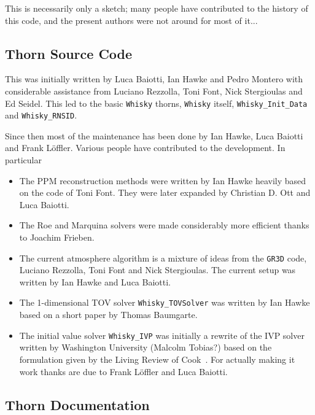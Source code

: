 \documentclass{article}
\begin{document}
This is necessarily only a sketch; many people have contributed to
the history of this code, and the present authors were not around for most of it...

\subsection{Thorn Source Code}

This was initially written by Luca Baiotti, Ian Hawke and Pedro
Montero with considerable assistance from Luciano Rezzolla, Toni Font,
Nick Stergioulas and Ed Seidel. This led to the basic {\tt Whisky} thorns,
{\tt Whisky} itself, {\tt Whisky\_Init\_Data} and {\tt Whisky\_RNSID}.

Since then most of the maintenance has been done by Ian Hawke, Luca Baiotti and Frank L\"offler. Various
people have contributed to the development. In particular
\begin{itemize}
\item The PPM reconstruction methods were written by Ian Hawke heavily
  based on the code of Toni Font. They were later expanded by Christian D. Ott and Luca Baiotti.
\item The Roe and Marquina solvers were made considerably more
  efficient thanks to Joachim Frieben.
\item The current atmosphere algorithm is a mixture of ideas from the
  {\tt GR3D} code, Luciano Rezzolla, Toni Font and Nick
  Stergioulas. The current setup was written by Ian Hawke and Luca Baiotti.
\item The 1-dimensional TOV solver {\tt Whisky\_TOVSolver} was written
  by Ian Hawke based on a short paper by Thomas Baumgarte.
\item The initial value solver {\tt Whisky\_IVP} was initially a
  rewrite of the IVP solver written by Washington University (Malcolm
  Tobias?) based on the formulation given by the Living Review of
  Cook~\cite{Cook00}. For actually making it work thanks are due to
  Frank L\"offler and Luca Baiotti.
\end{itemize}

\subsection{Thorn Documentation}
\end{document}

